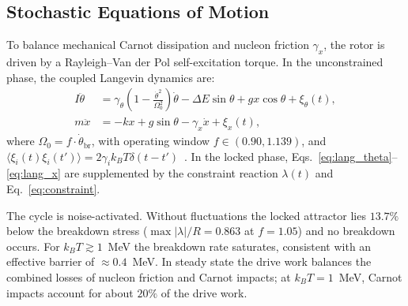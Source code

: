 \documentclass[aps,prc,twocolumn,superscriptaddress,amsmath,amssymb,nofootinbib]{revtex4-2}
\begin{document}
\subsection{Stochastic Equations of Motion}
To balance mechanical Carnot dissipation and nucleon friction \(\gamma_x\), the rotor is driven by a Rayleigh--Van der Pol self-excitation torque. In the unconstrained phase, the coupled Langevin dynamics are:
\begin{align}
I \ddot{\theta} &= \gamma_\theta \left(1 - \frac{\dot{\theta}^2}{\Omega_0^2}\right)\dot{\theta} - \Delta E \sin\theta + g x \cos\theta + \xi_\theta(t), \label{eq:lang_theta} \\
m \ddot{x} &= -k x + g \sin\theta - \gamma_x \dot{x} + \xi_x(t), \label{eq:lang_x}
\end{align}
where \(\Omega_0 = f \cdot \dot{\theta}_{\text{br}}\), with operating window \(f \in (0.90, 1.139)\), and \(\langle \xi_i(t) \xi_i(t') \rangle = 2 \gamma_i k_B T \delta(t-t')\)~\cite{Kubo1966}. In the locked phase, Eqs.~\eqref{eq:lang_theta}--\eqref{eq:lang_x} are supplemented by the constraint reaction \(\lambda(t)\) and Eq.~\eqref{eq:constraint}.

The cycle is noise-activated. Without fluctuations the locked attractor lies \(13.7\%\) below the breakdown stress (\(\max|\lambda|/R = 0.863\) at \(f=1.05\)) and no breakdown occurs. For \(k_BT \gtrsim 1\)~MeV the breakdown rate saturates, consistent with an effective barrier of \(\approx 0.4\)~MeV. In steady state the drive work balances the combined losses of nucleon friction and Carnot impacts; at \(k_BT = 1\)~MeV, Carnot impacts account for about \(20\%\) of the drive work.
\end{document}
